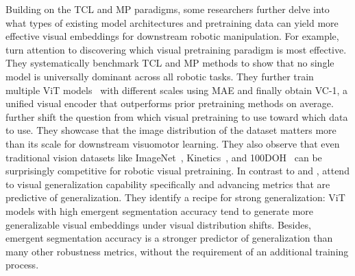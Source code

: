 \documentclass[Afour,sageh,times]{sagej}
\begin{document}
Building on the TCL and MP paradigms, some researchers further delve into what types of existing model architectures and pretraining data can yield more effective visual embeddings for downstream robotic manipulation. For example, \cite{majumdar2023we} turn attention to discovering which visual pretraining paradigm is most effective. They systematically benchmark TCL and MP methods to show that no single model is universally dominant across all robotic tasks. They further train multiple ViT models~\citep{dosovitskiy2020image} with different scales using MAE and finally obtain VC-1, a unified visual encoder that outperforms prior pretraining methods on average. \cite{dasari2023unbiased} further shift the question from which visual pretraining to use toward which data to use. They showcase that the image distribution of the dataset matters more than its scale for downstream visuomotor learning. They also observe that even traditional vision datasets like ImageNet~\citep{deng2009imagenet}, Kinetics~\citep{smaira2020short}, and 100DOH~\citep{shan2020understanding} can be surprisingly competitive for robotic visual pretraining.
In contrast to \cite{dasari2023unbiased} and \cite{majumdar2023we}, \cite{burns2023makes} attend to visual generalization capability specifically and advancing metrics that are predictive of generalization. They identify a recipe for strong generalization: ViT models with high emergent segmentation accuracy tend to generate more generalizable visual embeddings under visual distribution shifts. Besides, emergent segmentation accuracy is a stronger predictor of generalization than many other robustness metrics, without the requirement of an additional training process.
\end{document}
